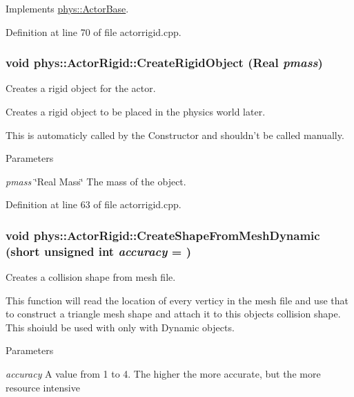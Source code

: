 Implements \hyperlink{classphys_1_1ActorBase_ac5d4ad5a634b16000742f506ed5957fb}{phys::ActorBase}.



Definition at line 70 of file actorrigid.cpp.

\hypertarget{classphys_1_1ActorRigid_a19227c52b972cd96ad69a7b6273e2bbf}{
\subsubsection[{CreateRigidObject}]{\setlength{\rightskip}{0pt plus 5cm}void phys::ActorRigid::CreateRigidObject ({\bf Real} {\em pmass})}}
\label{d8/d71/classphys_1_1ActorRigid_a19227c52b972cd96ad69a7b6273e2bbf}


Creates a rigid object for the actor. 

Creates a rigid object to be placed in the physics world later. \par
 This is automaticly called by the Constructor and shouldn't be called manually. 
\begin{DoxyParams}{Parameters}
\item[{\em pmass}]\char`\"{}Real Mass\char`\"{} The mass of the object. \end{DoxyParams}


Definition at line 63 of file actorrigid.cpp.

\hypertarget{classphys_1_1ActorRigid_aab4a408ce0724be6adf4c9f51f55f8a1}{
\subsubsection[{CreateShapeFromMeshDynamic}]{\setlength{\rightskip}{0pt plus 5cm}void phys::ActorRigid::CreateShapeFromMeshDynamic (short unsigned int {\em accuracy} = {})}}
\label{d8/d71/classphys_1_1ActorRigid_aab4a408ce0724be6adf4c9f51f55f8a1}


Creates a collision shape from mesh file. 

This function will read the location of every verticy in the mesh file and use that to construct a triangle mesh shape and attach it to this objects collision shape. This shoiuld be used with only with Dynamic objects. 
\begin{DoxyParams}{Parameters}
\item[{\em accuracy}]A value from 1 to 4. The higher the more accurate, but the more resource intensive \end{DoxyParams}


